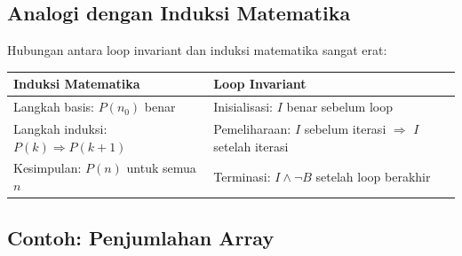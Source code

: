 \subsection{Analogi dengan Induksi Matematika}

Hubungan antara loop invariant dan induksi matematika sangat erat:

\begin{center}
\renewcommand{\arraystretch}{1.3}
\begin{tabular}{|>{\raggedright\arraybackslash}p{5cm}|>{\raggedright\arraybackslash}p{5cm}|}
\hline
\textbf{Induksi Matematika} & \textbf{Loop Invariant} \\ \hline
Langkah basis: $P(n_0)$ benar & Inisialisasi: $I$ benar sebelum loop \\ \hline
Langkah induksi: $P(k) \Rightarrow P(k+1)$ & Pemeliharaan: $I$ sebelum iterasi $\Rightarrow$ $I$ setelah iterasi \\ \hline
Kesimpulan: $P(n)$ untuk semua $n$ & Terminasi: $I \wedge \neg B$ setelah loop berakhir \\ \hline
\end{tabular}
\end{center}

\subsection{Contoh: Penjumlahan Array}

